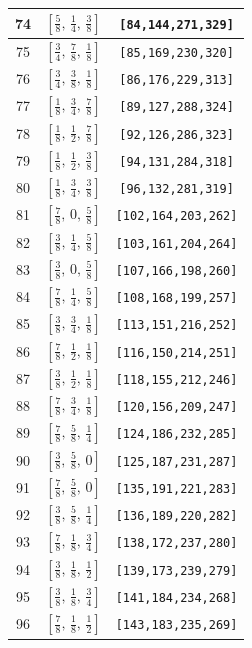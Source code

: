\documentclass[fleqn,8pt]{jsarticle}
\begin{document}
\begin{longtable}{ccc}
74 & $\left[ \frac{5}{8},\, \frac{1}{4},\, \frac{3}{8} \right]$ & {\tt [84,144,271,329]} \\ \hline
75 & $\left[ \frac{3}{4},\, \frac{7}{8},\, \frac{1}{8} \right]$ & {\tt [85,169,230,320]} \\ \hline
76 & $\left[ \frac{3}{4},\, \frac{3}{8},\, \frac{1}{8} \right]$ & {\tt [86,176,229,313]} \\ \hline
77 & $\left[ \frac{1}{8},\, \frac{3}{4},\, \frac{7}{8} \right]$ & {\tt [89,127,288,324]} \\ \hline
78 & $\left[ \frac{1}{8},\, \frac{1}{2},\, \frac{7}{8} \right]$ & {\tt [92,126,286,323]} \\ \hline
79 & $\left[ \frac{1}{8},\, \frac{1}{2},\, \frac{3}{8} \right]$ & {\tt [94,131,284,318]} \\ \hline
80 & $\left[ \frac{1}{8},\, \frac{3}{4},\, \frac{3}{8} \right]$ & {\tt [96,132,281,319]} \\ \hline
81 & $\left[ \frac{7}{8},\, 0,\, \frac{5}{8} \right]$ & {\tt [102,164,203,262]} \\ \hline
82 & $\left[ \frac{3}{8},\, \frac{1}{4},\, \frac{5}{8} \right]$ & {\tt [103,161,204,264]} \\ \hline
83 & $\left[ \frac{3}{8},\, 0,\, \frac{5}{8} \right]$ & {\tt [107,166,198,260]} \\ \hline
84 & $\left[ \frac{7}{8},\, \frac{1}{4},\, \frac{5}{8} \right]$ & {\tt [108,168,199,257]} \\ \hline
85 & $\left[ \frac{3}{8},\, \frac{3}{4},\, \frac{1}{8} \right]$ & {\tt [113,151,216,252]} \\ \hline
86 & $\left[ \frac{7}{8},\, \frac{1}{2},\, \frac{1}{8} \right]$ & {\tt [116,150,214,251]} \\ \hline
87 & $\left[ \frac{3}{8},\, \frac{1}{2},\, \frac{1}{8} \right]$ & {\tt [118,155,212,246]} \\ \hline
88 & $\left[ \frac{7}{8},\, \frac{3}{4},\, \frac{1}{8} \right]$ & {\tt [120,156,209,247]} \\ \hline
89 & $\left[ \frac{7}{8},\, \frac{5}{8},\, \frac{1}{4} \right]$ & {\tt [124,186,232,285]} \\ \hline
90 & $\left[ \frac{3}{8},\, \frac{5}{8},\, 0 \right]$ & {\tt [125,187,231,287]} \\ \hline
91 & $\left[ \frac{7}{8},\, \frac{5}{8},\, 0 \right]$ & {\tt [135,191,221,283]} \\ \hline
92 & $\left[ \frac{3}{8},\, \frac{5}{8},\, \frac{1}{4} \right]$ & {\tt [136,189,220,282]} \\ \hline
93 & $\left[ \frac{7}{8},\, \frac{1}{8},\, \frac{3}{4} \right]$ & {\tt [138,172,237,280]} \\ \hline
94 & $\left[ \frac{3}{8},\, \frac{1}{8},\, \frac{1}{2} \right]$ & {\tt [139,173,239,279]} \\ \hline
95 & $\left[ \frac{3}{8},\, \frac{1}{8},\, \frac{3}{4} \right]$ & {\tt [141,184,234,268]} \\ \hline
96 & $\left[ \frac{7}{8},\, \frac{1}{8},\, \frac{1}{2} \right]$ & {\tt [143,183,235,269]} \\
\end{longtable}
\end{document}
